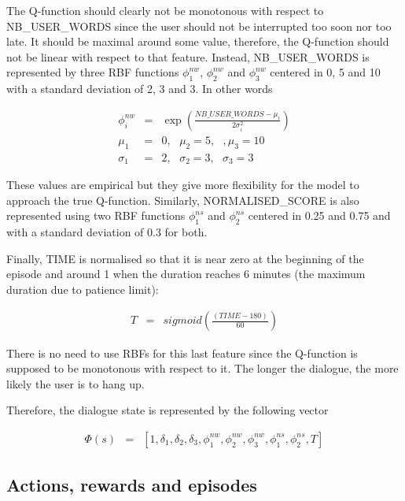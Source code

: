         The Q-function should clearly not be monotonous with respect to NB\_USER\_WORDS since the user should not be interrupted too soon nor too late. It should be maximal around some value, therefore, the Q-function should not be linear with respect to that feature. Instead, NB\_USER\_WORDS is represented by three RBF functions $\phi^{nw}_1$, $\phi^{nw}_2$ and $\phi^{nw}_3$ centered in 0, 5 and 10 with a standard deviation of 2, 3 and 3. In other words
        
				\begin{eqnarray}
					\phi^{nw}_i & = & \exp (\frac{NB\_USER\_WORDS - \mu_i}{2 \sigma_i^2}) \\
          \mu_1 & = & 0, \text{ } \mu_2 = 5, \text{ }, \mu_3 = 10 \nonumber \\
          \sigma_1 & = & 2, \text{ } \sigma_2 = 3, \text{ } \sigma_3 = 3 \nonumber
				\end{eqnarray}
            
      	These values are empirical but they give more flexibility for the model to approach the true Q-function. Similarly, NORMALISED\_SCORE is also represented using two RBF functions $\phi^{ns}_1$ and $\phi^{ns}_2$ centered in 0.25 and 0.75 and with a standard deviation of 0.3 for both.
        
        Finally, TIME is normalised so that it is near zero at the beginning of the episode and around 1 when the duration reaches 6 minutes (the maximum duration due to patience limit):
        
				\begin{eqnarray}
					T & = & sigmoid(\frac{(TIME-180)}{60})
				\end{eqnarray}
            
       	There is no need to use RBFs for this last feature since the Q-function is supposed to be monotonous with respect to it. The longer the dialogue, the more likely the user is to hang up.
        
        Therefore, the dialogue state is represented by the following vector
        
				\begin{eqnarray}
					\Phi(s) & = & [1,\delta_1,\delta_2,\delta_3,\phi^{nw}_1,\phi^{nw}_2,\phi^{nw}_3,\phi^{ns}_1,\phi^{ns}_2,T]
				\end{eqnarray}
            
   	\subsection{Actions, rewards and episodes}
    
